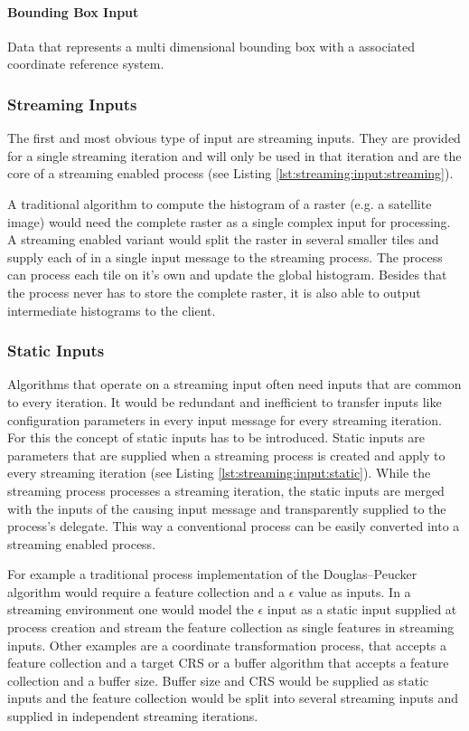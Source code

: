 		\paragraph{Bounding Box Input}
			Data that represents a multi dimensional bounding box with a associated coordinate reference system.
		\subsubsection{Streaming Inputs}
			\label{sec:streaming:input:streaming}
			The first and most obvious type of input are streaming inputs. They are provided for a single streaming iteration and will only be used in that iteration and are the core of a streaming enabled process (see Listing \ref{lst:streaming:input:streaming}).

			A traditional algorithm to compute the histogram of a raster (e.g. a satellite image) would need the complete raster as a single complex input for processing. A streaming enabled variant would split the raster in several smaller tiles and supply each of in a single input message to the streaming process. The process can process each tile on it's own and update the global histogram. Besides that the process never has to store the complete raster, it is also able to output intermediate histograms to the client.

		\subsubsection{Static Inputs}
			\label{sec:stream:input:static}
			Algorithms that operate on a streaming input often need inputs that are common to every iteration. It would be redundant and inefficient to transfer inputs like configuration parameters in every input message for every streaming iteration. For this the concept of static inputs has to be introduced. Static inputs are parameters that are supplied when a streaming process is created and apply to every streaming iteration (see Listing \ref{lst:streaming:input:static}). While the streaming process processes a streaming iteration, the static inputs are merged with the inputs of the causing input message and transparently supplied to the process's delegate. This way a conventional process can be easily converted into a streaming enabled process.

			For example a traditional process implementation of the Douglas–Peucker algorithm \citep{douglas1973algorithms} would require a feature collection and a $\epsilon$ value as inputs. In a streaming environment one would model the $\epsilon$ input as a static input supplied at process creation and stream the feature collection as single features in streaming inputs. Other examples are a coordinate transformation process, that accepts a feature collection and a target \ac{CRS} or a buffer algorithm that accepts a feature collection and a buffer size. Buffer size and \ac{CRS} would be supplied as static inputs and the feature collection would be split into several streaming inputs and supplied in independent streaming iterations.

